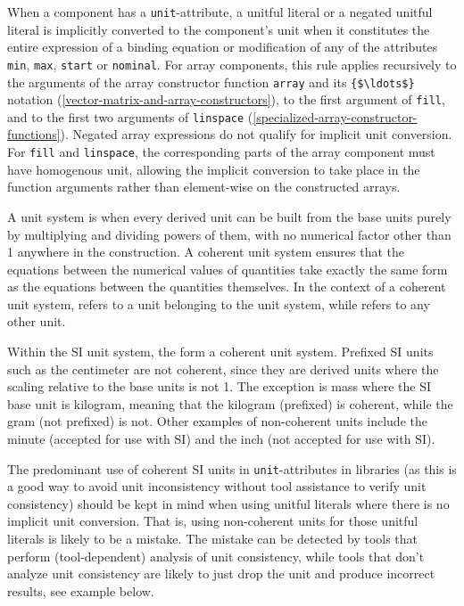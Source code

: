 When a component has a \lstinline!unit!-attribute, a unitful literal or a negated unitful literal is implicitly converted to the component's unit when it constitutes the entire expression of a binding equation or modification of any of the attributes \lstinline!min!, \lstinline!max!, \lstinline!start! or \lstinline!nominal!.
For array components, this rule applies recursively to the arguments of the array constructor function \lstinline!array! and its \lstinline!{$\ldots$}! notation (\cref{vector-matrix-and-array-constructors}), to the first argument of \lstinline!fill!, and to the first two arguments of \lstinline!linspace! (\cref{specialized-array-constructor-functions}).
Negated array expressions do not qualify for implicit unit conversion.
For \lstinline!fill! and \lstinline!linspace!, the corresponding parts of the array component must have homogenous unit, allowing the implicit conversion to take place in the function arguments rather than element-wise on the constructed arrays.

\begin{nonnormative}
A unit system is  when every derived unit can be built from the base units purely by multiplying and dividing powers of them, with no numerical factor other than 1 anywhere in the construction.
A coherent unit system ensures that the equations between the numerical values of quantities take exactly the same form as the equations between the quantities themselves.
In the context of a coherent unit system,  refers to a unit belonging to the unit system, while  refers to any other unit.

Within the SI unit system, the  form a coherent unit system.
Prefixed SI units such as the centimeter are not coherent, since they are derived units where the scaling relative to the base units is not 1.
The exception is mass where the SI base unit is kilogram, meaning that the kilogram (prefixed) is coherent, while the gram (not prefixed) is not.
Other examples of non-coherent units include the minute (accepted for use with SI) and the inch (not accepted for use with SI).

The predominant use of coherent SI units in \lstinline!unit!-attributes in libraries (as this is a good way to avoid unit inconsistency without tool assistance to verify unit consistency) should be kept in mind when using unitful literals where there is no implicit unit conversion.
That is, using non-coherent units for those unitful literals is likely to be a mistake.
The mistake can be detected by tools that perform (tool-dependent) analysis of unit consistency, while tools that don't analyze unit consistency are likely to just drop the unit and produce incorrect results, see example below.
\end{nonnormative}

